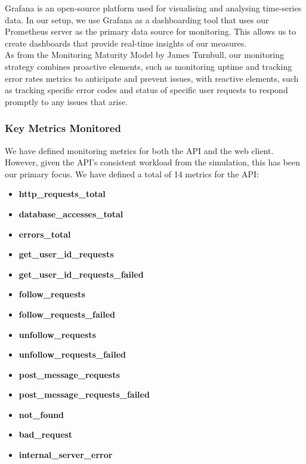 Grafana is an open-source platform used for visualising and analysing time-series data. In our setup, we use Grafana as a dashboarding tool that uses our Prometheus server as the primary data source for monitoring. This allows us to create dashboards that provide real-time insights of our measures.\\

As from the Monitoring Maturity Model by James Turnbull\cite{MonitoringMaturityModel}, our monitoring strategy combines proactive elements, such as monitoring uptime and tracking error rates metrics to anticipate and prevent issues, with reactive elements, such as tracking specific error codes and status of specific user requests to respond promptly to any issues that arise.

\subsubsection*{Key Metrics Monitored}
We have defined monitoring metrics for both the API and the web client. However, given the API's consistent workload from the simulation, this has been our primary focus. We have defined a total of 14 metrics for the API:
\begin{multicols}{2}
\begin{itemize}
    \item \textbf{http\_requests\_total}
    \item \textbf{database\_accesses\_total}
    \item \textbf{errors\_total}
    \item \textbf{get\_user\_id\_requests}
    \item \textbf{get\_user\_id\_requests\_failed}
    \item \textbf{follow\_requests}
    \item \textbf{follow\_requests\_failed}
    \item \textbf{unfollow\_requests}
    \item \textbf{unfollow\_requests\_failed}
    \item \textbf{post\_message\_requests}
    \item \textbf{post\_message\_requests\_failed}
    \item \textbf{not\_found}
    \item \textbf{bad\_request}
    \item \textbf{internal\_server\_error}
\end{itemize}
\end{multicols}

